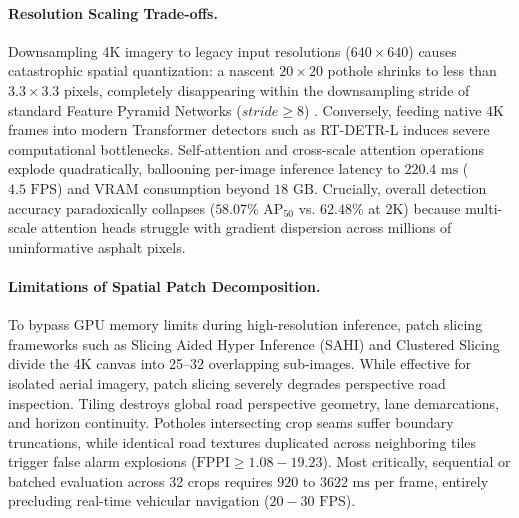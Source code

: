 \documentclass[runningheads]{llncs}
\begin{document}
\paragraph{Resolution Scaling Trade-offs.}
Downsampling 4K imagery to legacy input resolutions ($640 \times 640$) causes catastrophic spatial quantization: a nascent $20 \times 20$ pothole shrinks to less than $3.3 \times 3.3$ pixels, completely disappearing within the downsampling stride of standard Feature Pyramid Networks ($stride \ge 8$) \cite{lin2017feature}. Conversely, feeding native 4K frames into modern Transformer detectors such as RT-DETR-L \cite{lv2023detrs} induces severe computational bottlenecks. Self-attention and cross-scale attention operations explode quadratically, ballooning per-image inference latency to $220.4\text{ ms}$ ($4.5\text{ FPS}$) and VRAM consumption beyond $18\text{ GB}$. Crucially, overall detection accuracy paradoxically collapses ($58.07\% \text{ AP}_{50}$ vs. $62.48\%$ at 2K) because multi-scale attention heads struggle with gradient dispersion across millions of uninformative asphalt pixels.

\paragraph{Limitations of Spatial Patch Decomposition.}
To bypass GPU memory limits during high-resolution inference, patch slicing frameworks such as Slicing Aided Hyper Inference (SAHI) \cite{akyon2022sahi} and Clustered Slicing \cite{yang2019clustered} divide the 4K canvas into 25--32 overlapping sub-images. While effective for isolated aerial imagery, patch slicing severely degrades perspective road inspection. Tiling destroys global road perspective geometry, lane demarcations, and horizon continuity. Potholes intersecting crop seams suffer boundary truncations, while identical road textures duplicated across neighboring tiles trigger false alarm explosions ($\text{FPPI} \ge 1.08 - 19.23$). Most critically, sequential or batched evaluation across 32 crops requires $920\text{ to }3622\text{ ms}$ per frame, entirely precluding real-time vehicular navigation ($20-30\text{ FPS}$).
\end{document}
